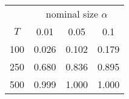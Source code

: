 % 
\begin{tabular}{cccc}
  \hline
  & \multicolumn{3}{c}{nominal size $\alpha$} \\
 $T$ & 0.01 & 0.05 & 0.1 \\
 \hline
100 & 0.026 & 0.102 & 0.179 \\ 
  250 & 0.680 & 0.836 & 0.895 \\ 
  500 & 0.999 & 1.000 & 1.000 \\ 
   \hline
\end{tabular}
